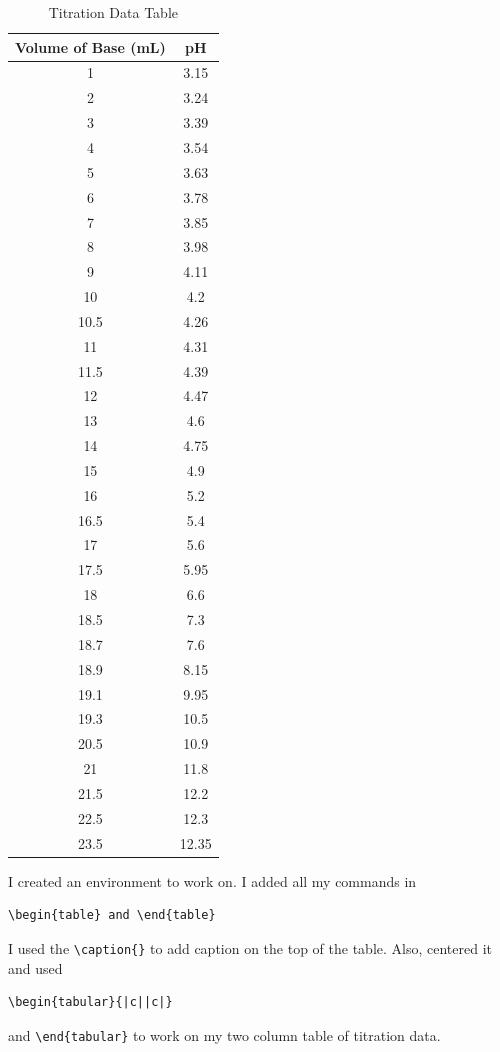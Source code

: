 \documentclass[12pt,journal,compsoc]{IEEEtran}
\begin{document}
%
\begin{table}[h]
\renewcommand{\arraystretch}{1.3}
\caption{Titration Data Table}
\label{table}
\centering
\begin{tabular}{|c||c|}
\hline
Volume of Base (mL)  & pH\\
\hline
1	& 3.15\\
2	& 3.24 \\
3	&3.39\\
4	&3.54\\
5	&3.63\\
6	&3.78\\
7	&3.85\\
8	&3.98\\
9	&4.11\\
10	&4.2\\
10.5	&4.26\\
11	&4.31\\
11.5	&4.39\\
12	&4.47\\
13	&4.6\\
14	&4.75\\
15	&4.9\\
16	&5.2\\
16.5	&5.4\\
17	&5.6\\
17.5	&5.95\\
18	&6.6\\
18.5	&7.3\\
18.7	&7.6\\
18.9	&8.15\\
19.1	&9.95\\
19.3	&10.5\\
20.5	&10.9\\
21	&11.8\\
21.5	&12.2\\
22.5	&12.3\\
23.5	&12.35\\
\hline
\end{tabular}
\end{table}
I created an environment to work on. 
I added all my commands in
\begin{verbatim}
\begin{table} and \end{table}
\end{verbatim}
I used the \verb|\caption{}| to add caption on the top of the table. 
Also, centered it and used \begin{verbatim}
\begin{tabular}{|c||c|} 
\end{verbatim} and \verb|\end{tabular}| to work on my two column table of titration data.
\end{document}
